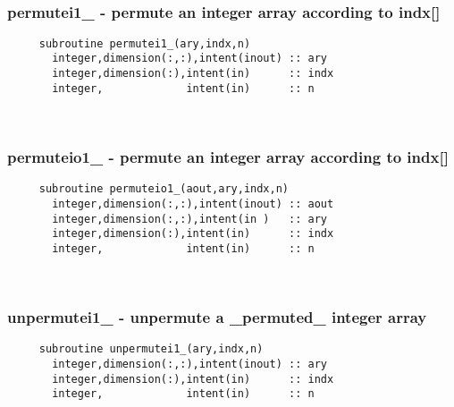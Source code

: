  
\mbox{}\hrulefill\ 
 
  \subsubsection{permutei1\_ - permute an integer array according to indx[]}

\begin{verbatim} 
     subroutine permutei1_(ary,indx,n)
       integer,dimension(:,:),intent(inout) :: ary
       integer,dimension(:),intent(in)      :: indx
       integer,             intent(in)      :: n
 \end{verbatim}%
 
 
\mbox{}\hrulefill\ 
 
  \subsubsection{permuteio1\_ - permute an integer array according to indx[]}

\begin{verbatim} 
     subroutine permuteio1_(aout,ary,indx,n)
       integer,dimension(:,:),intent(inout) :: aout
       integer,dimension(:,:),intent(in )   :: ary
       integer,dimension(:),intent(in)      :: indx
       integer,             intent(in)      :: n
 \end{verbatim}%
 
 
\mbox{}\hrulefill\ 

  \subsubsection{unpermutei1\_ - unpermute a \_permuted\_ integer array}

\begin{verbatim} 
     subroutine unpermutei1_(ary,indx,n)
       integer,dimension(:,:),intent(inout) :: ary
       integer,dimension(:),intent(in)      :: indx
       integer,             intent(in)      :: n
 \end{verbatim}%
 
